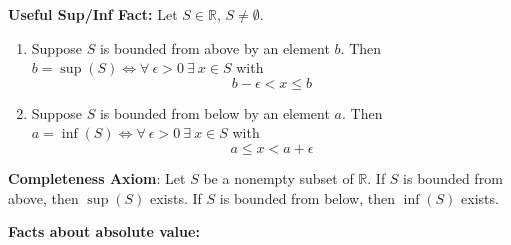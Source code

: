 \begin{proposition} \textbf{Useful Sup/Inf Fact:} Let \(S \in \mathbb{R}\), \(S \neq \emptyset\). 

\begin{enumerate}[(1)]

\item Suppose \(S\) is bounded from above by an element \(b\). Then \(b = \sup(S) \iff \forall \ \epsilon >0 \ \exists \ x \in S\) with \[b - \epsilon < x \leq b\]

\item Suppose \(S\) is bounded from below by an element \(a\). Then \(a = \inf(S) \iff \forall \ \epsilon >0 \ \exists \ x \in S\) with \[a \leq x < a + \epsilon\]

\end{enumerate}

\end{proposition}

\textbf{Completeness Axiom}: Let \(S\) be a nonempty subset of \(\mathbb{R}\). If \(S\) is bounded from above, then \(\sup(S)\) exists. If \(S\) is bounded from below, then \(\inf(S)\) exists.


\textbf{Facts about absolute value:}

